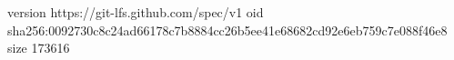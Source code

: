 version https://git-lfs.github.com/spec/v1
oid sha256:0092730c8c24ad66178c7b8884cc26b5ee41e68682cd92e6eb759c7e088f46e8
size 173616
